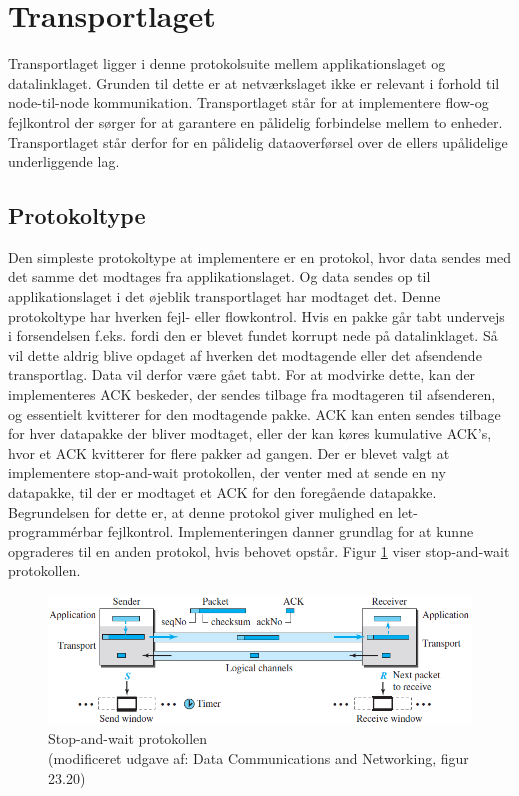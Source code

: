 \section{Transportlaget}
Transportlaget ligger i denne protokolsuite mellem applikationslaget og datalinklaget. Grunden til dette er at netværkslaget ikke er relevant i forhold til node-til-node kommunikation. Transportlaget står for at implementere flow-og fejlkontrol der sørger for at garantere en pålidelig forbindelse mellem to enheder. Transportlaget står derfor for en pålidelig dataoverførsel over de ellers upålidelige underliggende lag.

\subsection{Protokoltype}
Den simpleste protokoltype at implementere er en protokol, hvor data sendes med det samme det modtages fra applikationslaget. Og data sendes op til applikationslaget i det øjeblik transportlaget har modtaget det. Denne protokoltype har hverken fejl- eller flowkontrol. Hvis en pakke går tabt undervejs i forsendelsen f.eks. fordi den er blevet fundet korrupt nede på datalinklaget. Så vil dette aldrig blive opdaget af hverken det modtagende eller det afsendende transportlag. Data vil derfor være gået tabt. For at modvirke dette, kan der implementeres ACK beskeder, der sendes tilbage fra modtageren til afsenderen, og essentielt kvitterer for den modtagende pakke. ACK kan enten sendes tilbage for hver datapakke der bliver modtaget, eller der kan køres kumulative ACK's, hvor et ACK kvitterer for flere pakker ad gangen. Der er blevet valgt at implementere stop-and-wait protokollen, der venter med at sende en ny datapakke, til der er modtaget et ACK for den foregående datapakke. Begrundelsen for dette er, at denne protokol giver mulighed en let-programmérbar fejlkontrol. Implementeringen danner grundlag for at kunne opgraderes til en anden protokol, hvis behovet opstår. Figur \ref{StopAndWait} viser stop-and-wait protokollen.
\begin{figure}[h]
\centering
\includegraphics[scale=0.75]{Billeder/StopAndWait.png}
\caption{Stop-and-wait protokollen \\ (modificeret udgave af: Data Communications and Networking, figur 23.20)
\label{StopAndWait}}
\end{figure}

